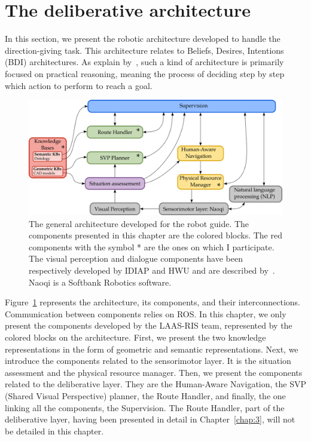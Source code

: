 \section{The deliberative architecture}

In this section, we present the robotic architecture developed to handle the direction-giving task. This architecture relates to Beliefs, Desires, Intentions (BDI) architectures. As explain by~\cite{wooldridge_1999_intelligent}, such a kind of architecture is primarily focused on practical reasoning, meaning the process of deciding step by step which action to perform to reach a goal. 

\begin{figure}[ht!]
\centering
\includegraphics[width=\textwidth]{figures/chapter8/architecture.png}
\caption{\label{fig:chap8_architecture} The general architecture developed for the robot guide. The components presented in this chapter are the colored blocks. The red components with the symbol * are the ones on which I participate. The visual perception and dialogue components have been respectively developed by IDIAP and HWU and are described by~\cite{foster_2019_mummer}. Naoqi is a Softbank Robotics software. }
\end{figure}

Figure~\ref{fig:chap8_architecture} represents the architecture, its components, and their interconnections. Communication between components relies on ROS. In this chapter, we only present the components developed by the LAAS-RIS team, represented by the colored blocks on the architecture. First, we present the two knowledge representations in the form of geometric and semantic representations. Next, we introduce the components related to the sensorimotor layer. It is the situation assessment and the physical resource manager. Then, we present the components related to the deliberative layer. They are the Human-Aware Navigation, the SVP (Shared Visual Perspective) planner, the Route Handler, and finally, the one linking all the components, the Supervision. The Route Handler, part of the deliberative layer, having been presented in detail in Chapter~\ref{chap:3}, will not be detailed in this chapter.

